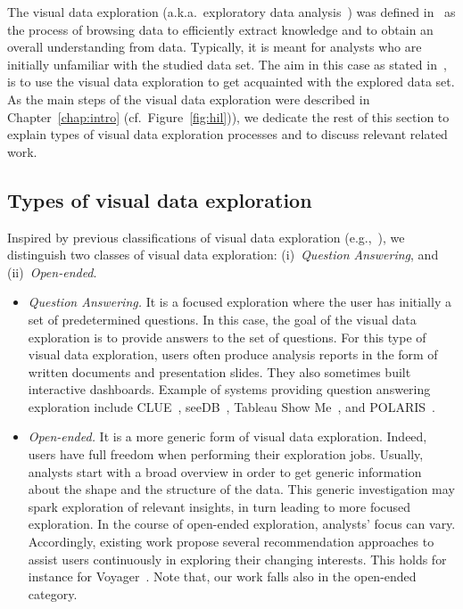 The visual data exploration (a.k.a.~exploratory data analysis~\cite{Idreos2015,CuiBYE19,Wongsuphasawat2016}) was defined in~\cite{Idreos2015,CuiBYE19} as the process of browsing  data to efficiently extract knowledge and to obtain an overall understanding from data.
Typically, it is meant for analysts who are initially unfamiliar with the studied data set. %
The aim in this case as stated in~\cite{Sellam:16}, is to use the visual data exploration to get acquainted with the explored data set.
As the main steps of the visual data exploration were described in Chapter~\ref{chap:intro} (cf.~Figure~\ref{fig:hil})), we dedicate the rest of this section to explain types of visual data exploration processes and to discuss relevant related work.

\subsection{Types of visual data exploration}
Inspired by previous classifications of visual data exploration (e.g.,~\cite{augmentingwongsuphasawat2018}), we distinguish two classes of visual data exploration: (i)~\emph{Question Answering}, and (ii)~\emph{Open-ended}. 
\begin{itemize}
\item \emph{Question Answering.}
It is a focused exploration where the user has initially a set of predetermined questions. 
In this case, the goal of the visual data exploration is to provide answers to the set of questions.
For this type of visual data exploration, users often produce analysis reports in the form of written documents and presentation slides. They also sometimes built interactive dashboards.
Example of systems providing question answering exploration include CLUE~\cite{2016_eurovis_clue}, seeDB~\cite{Vartak}, Tableau Show Me~\cite{Mackinlay:2007}, and POLARIS~\cite{polaris2002}.

\item \emph{Open-ended.} 
It is a more generic form of visual data exploration. Indeed, users have full freedom when performing their exploration jobs. Usually, analysts start with a broad overview in order to get generic information about the shape and the structure of the data. This generic investigation may spark exploration of relevant insights, in turn leading to more focused exploration. In the course of open-ended exploration, analysts' focus can vary. Accordingly,  existing work propose several recommendation approaches to assist users continuously in exploring their changing interests. 
This holds for instance for Voyager~\cite{Wongsuphasawat2016,Wongsuphasawat:2017}.
Note that, our work falls also in the open-ended category. 
\end{itemize}





